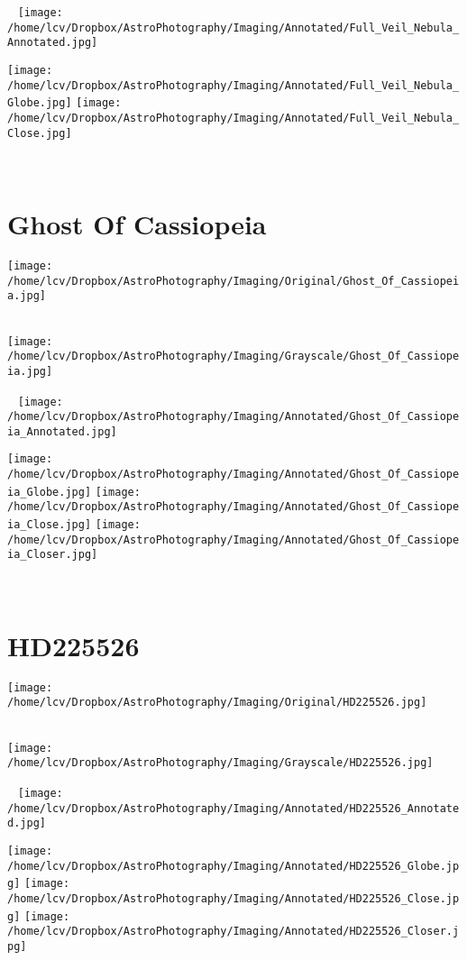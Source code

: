 \begin{center}
 \ \newpage
\texttt{[image: /home/lcv/Dropbox/AstroPhotography/Imaging/Annotated/Full\_Veil\_Nebula\_Annotated.jpg]}

\texttt{[image: /home/lcv/Dropbox/AstroPhotography/Imaging/Annotated/Full\_Veil\_Nebula\_Globe.jpg]}
\texttt{[image: /home/lcv/Dropbox/AstroPhotography/Imaging/Annotated/Full\_Veil\_Nebula\_Close.jpg]}
\end{center}
\ \\\section{Ghost Of Cassiopeia}
\texttt{[image: /home/lcv/Dropbox/AstroPhotography/Imaging/Original/Ghost\_Of\_Cassiopeia.jpg]}
{\footnotesize\color{white}


}\ \\
\texttt{[image: /home/lcv/Dropbox/AstroPhotography/Imaging/Grayscale/Ghost\_Of\_Cassiopeia.jpg]}
\begin{center}
 \ \newpage
\texttt{[image: /home/lcv/Dropbox/AstroPhotography/Imaging/Annotated/Ghost\_Of\_Cassiopeia\_Annotated.jpg]}

\texttt{[image: /home/lcv/Dropbox/AstroPhotography/Imaging/Annotated/Ghost\_Of\_Cassiopeia\_Globe.jpg]}
\texttt{[image: /home/lcv/Dropbox/AstroPhotography/Imaging/Annotated/Ghost\_Of\_Cassiopeia\_Close.jpg]}
\texttt{[image: /home/lcv/Dropbox/AstroPhotography/Imaging/Annotated/Ghost\_Of\_Cassiopeia\_Closer.jpg]}
\end{center}
\ \\\section{HD225526}
\texttt{[image: /home/lcv/Dropbox/AstroPhotography/Imaging/Original/HD225526.jpg]}
{\footnotesize\color{white}


}\ \\
\texttt{[image: /home/lcv/Dropbox/AstroPhotography/Imaging/Grayscale/HD225526.jpg]}
\begin{center}
 \ \newpage
\texttt{[image: /home/lcv/Dropbox/AstroPhotography/Imaging/Annotated/HD225526\_Annotated.jpg]}

\texttt{[image: /home/lcv/Dropbox/AstroPhotography/Imaging/Annotated/HD225526\_Globe.jpg]}
\texttt{[image: /home/lcv/Dropbox/AstroPhotography/Imaging/Annotated/HD225526\_Close.jpg]}
\texttt{[image: /home/lcv/Dropbox/AstroPhotography/Imaging/Annotated/HD225526\_Closer.jpg]}
\end{center}
